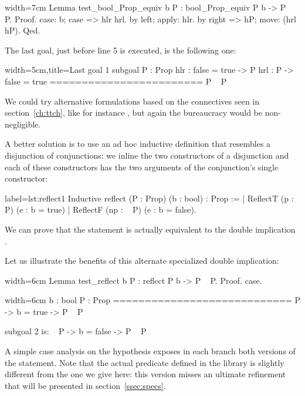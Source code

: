 \begin{coq}{}{width=7cm}
Lemma test_bool_Prop_equiv b P : bool_Prop_equiv P b -> P \/ ~ P.
Proof.
case: b; case => hlr hrl.
  by left; apply: hlr.
by right => hP; move: (hrl hP).
Qed.
\end{coq}

The last goal, just before line 5 is executed, is the following one:

\begin{coqout}{}{width=5cm,title=Last goal}
1 subgoal
P : Prop
hlr : false = true -> P
hrl : P -> false = true
========================
P \/ ~ P
\end{coqout}
We could try
alternative formulations based on the connectives seen in
section~\ref{ch:ttch}, like for instance
, but again the bureaucracy
would be non-negligible.

A better solution is
to use an ad hoc inductive definition that resembles a
disjunction of conjunctions: we inline the two constructors of a
disjunction and each of these constructors has the two arguments of
the conjunction's single constructor:

\begin{coq}{}{label=lst:reflect1}
Inductive reflect (P : Prop) (b : bool) : Prop :=
| ReflectT (p : P)    (e : b = true)
| ReflectF (np : ~ P) (e : b = false).
\end{coq}

We can prove that the statement  is actually equivalent
to the double implication . %

Let us illustrate the benefits of this alternate specialized double
implication:

\begin{coq-left}{}{width=6cm}
Lemma test_reflect b P :
  reflect P b -> P \/ ~ P.
Proof.
case.
$~$
$~$
$~$
\end{coq-left}
\begin{coqout-right}{}{width=6cm}
  b : bool
  P : Prop
  ============================
   P -> b = true -> P \/ ~ P

subgoal 2 is:
 ~ P -> b = false -> P \/ ~ P
\end{coqout-right}

A simple case analysis on the hypothesis  exposes in
each branch both versions of the statement.
Note that the actual
 predicate defined in the  library is
slightly different from the one we give here:
this version misses an ultimate refinement
that will be presented in
section~\ref{ssec:specs}.

